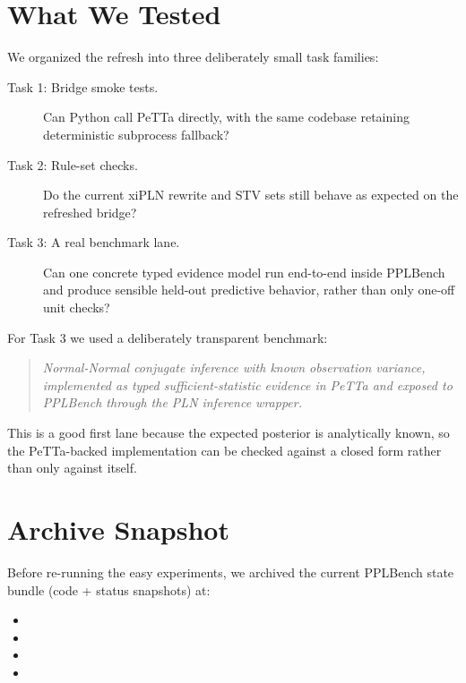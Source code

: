 \documentclass[11pt,openany]{report}
\begin{document}
\section{What We Tested}

We organized the refresh into three deliberately small task families:
\begin{description}
\item[Task 1: Bridge smoke tests.] Can Python call PeTTa directly, with the
same codebase retaining deterministic subprocess fallback?
\item[Task 2: Rule-set checks.] Do the current xiPLN rewrite and STV
sets still behave as expected on the refreshed bridge?
\item[Task 3: A real benchmark lane.] Can one concrete typed evidence model
run end-to-end inside PPLBench and produce sensible held-out predictive
behavior, rather than only one-off unit checks?
\end{description}

For Task 3 we used a deliberately transparent benchmark:
\begin{quote}
\emph{Normal-Normal conjugate inference with known observation variance,
implemented as typed sufficient-statistic evidence in PeTTa and exposed to
PPLBench through the PLN inference wrapper.}
\end{quote}
This is a good first lane because the expected posterior is analytically
known, so the PeTTa-backed implementation can be checked against a closed
form rather than only against itself.

\section{Archive Snapshot}

Before re-running the easy experiments, we archived the current PPLBench
state bundle (code + status snapshots) at:
\begin{itemize}
\item {}
\item {}
\item {}
\item {}
\end{itemize}
\end{document}
